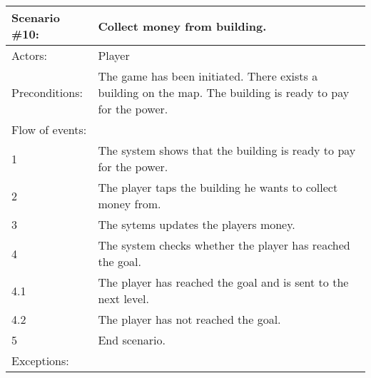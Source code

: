 \begin{tabular}{| l | p{10cm} |}
	\hline
	\rowcolor{lightgray}
	{\bf Scenario \#10:} & {\bf Collect money from building.} \\ \hline
	Actors: & Player \\ \hline
	Preconditions: & The game has been initiated. There exists a building on the map. The building is ready to pay for the power. \\ \hline
	Flow of events: & \\ \hline
	1 & The system shows that the building is ready to pay for the power. \\ \hline
	2 & The player taps the building he wants to collect money from. \\ \hline
	3 & The sytems updates the players money. \\ \hline
	4 & The system checks whether the player has reached the goal. \\ \hline
	4.1 & The player has reached the goal and is sent to the next level. \\ \hline
	4.2 & The player has not reached the goal. \\ \hline
	5 & End scenario. \\ \hline
	Exceptions: & \\ \hline
\end{tabular}
